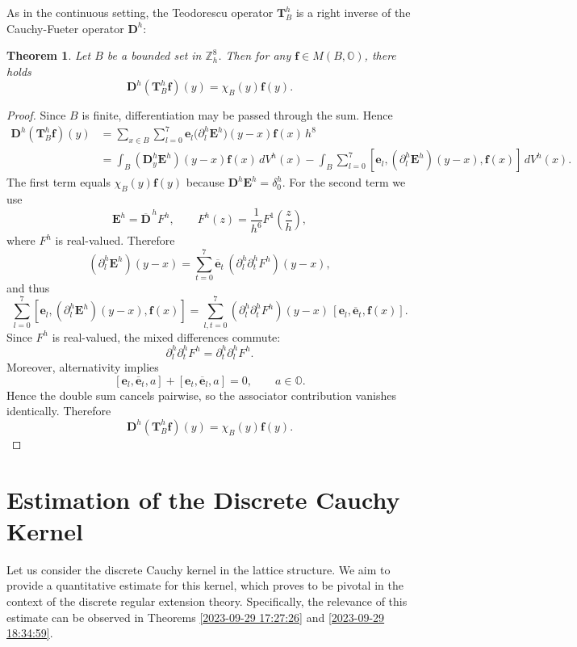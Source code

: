 \documentclass{amsart}
\newtheorem{theorem}{Theorem}[section]
\theoremstyle{definition}
\theoremstyle{remark}
\numberwithin{equation}{section}
\newcommand{\p}{\partial}
\newcommand{\OO}{\mathbb O}
\newcommand{\Z}{\mathbb Z}
\newcommand{\f}{\bm{f}}
\newcommand{\e}{\bm{e}}
\newcommand{\E}{\bm{E}}
\begin{document}
As in the continuous setting, the Teodorescu operator $\bm T^ h_ B$ is a right inverse of the Cauchy-Fueter operator $\bm D^h$:

\begin{theorem}\label{thm:teodorescu-right-inverse}\label{2023-09-29 15:22:41}
    Let $B$ be a bounded set in $\Z^8_h$. Then for any $\f\in M(B,\OO)$, there holds
    \[
\bm D^h(\bm T^h_B \f)(y)= \chi_B(y)\f(y).
\]
\end{theorem}

\begin{proof}
    Since $B$ is finite, differentiation may be passed through the sum. Hence
    \[
    \begin{aligned}
        \bm D^h(\bm T^h_B \f)(y)
        &= \sum_{x\in B}\sum_{l=0}^7 \e_l\bigl(\p_l^h \E^h\bigr)(y-x)\f(x)\,h^8\\
        &= \int_B (\bm D_y^h \E^h)(y-x)\f(x)\,dV^h(x)
           - \int_B \sum_{l=0}^7 [\e_l,(\p_l^h\E^h)(y-x),\f(x)]\,dV^h(x).
    \end{aligned}
    \]
    The first term equals \(\chi_B(y)\f(y)\) because \(\bm D^h\E^h=\delta_0^h\). For the second term we use
    \[
    \E^h=\bm{\overline D}^{\,h}F^h,
    \qquad
    F^h(z)=\frac{1}{h^6}F^1\!\left(\frac{z}{h}\right),
    \]
    where \(F^h\) is real-valued. Therefore
    \[
    (\p_l^h\E^h)(y-x)=\sum_{t=0}^7 \bm{\overline e}_t\,(\p_l^h\p_t^hF^h)(y-x),
    \]
    and thus
    \[
    \sum_{l=0}^7 [\e_l,(\p_l^h\E^h)(y-x),\f(x)]
    =
    \sum_{l,t=0}^7 (\p_l^h\p_t^hF^h)(y-x)\,[\e_l,\bm{\overline e}_t,\f(x)].
    \]
    Since \(F^h\) is real-valued, the mixed differences commute:
    \[
    \p_l^h\p_t^hF^h=\p_t^h\p_l^hF^h.
    \]
    Moreover, alternativity implies
    \[
    [\e_l,\bm{\overline e}_t,a]+[\e_t,\bm{\overline e}_l,a]=0,
    \qquad a\in\OO.
    \]
    Hence the double sum cancels pairwise, so the associator contribution vanishes identically. Therefore
    \[
    \bm D^h(\bm T^h_B \f)(y)=\chi_B(y)\f(y).
    \]
\end{proof}





\section{Estimation of the Discrete Cauchy Kernel}

Let us consider the discrete Cauchy kernel in the lattice structure. We aim to provide a quantitative estimate for this kernel, which proves to be pivotal in the context of the discrete regular extension theory. Specifically, the relevance of this estimate can be observed in Theorems \ref{2023-09-29 17:27:26} and \ref{2023-09-29 18:34:59}.
\end{document}
